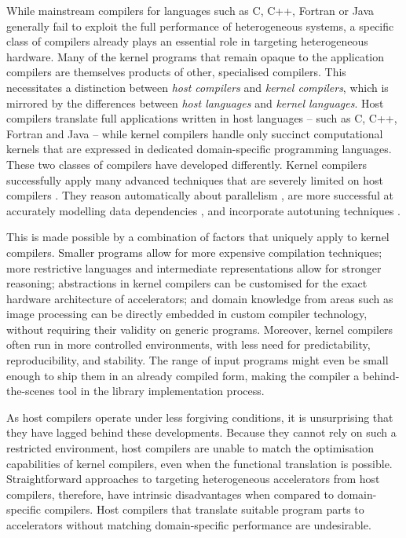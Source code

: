     While mainstream compilers for languages such as C, C++, Fortran or Java
    generally fail to exploit the full performance of heterogeneous systems, a
    specific class of compilers already plays an essential role in
    targeting heterogeneous hardware.
    Many of the kernel programs that remain opaque to the application compilers
    are themselves products of other, specialised compilers.
    This necessitates a distinction between {\em host compilers} and {\em kernel
    compilers}, which is mirrored by the differences between
    {\em host languages} and {\em kernel languages}.
    Host compilers translate full applications written in host languages -- such
    as C, C++, Fortran and Java -- while kernel compilers handle only succinct
    computational kernels that are expressed in dedicated domain-specific
    programming languages.
    These two classes of compilers have developed differently.
    Kernel compilers successfully apply many advanced techniques that are
    severely limited on host compilers
    \citep{Murphy2014LimitsOD,Maleki:2011:EVC:2120965.2121464}.
    They reason automatically about parallelism
    \citep{Steuwer:2017:LFD:3049832.3049841}, are more successful at accurately
    modelling data dependencies \cite{Ragan-Kelley2013Halide}, and incorporate
    autotuning techniques \citep{Ansel:2014:OEF:2628071.2628092}.

    This is made possible by a combination of factors that uniquely apply to
    kernel compilers.
    Smaller programs allow for more expensive compilation techniques;
    more restrictive languages and intermediate representations allow for
    stronger reasoning;
    abstractions in kernel compilers can be customised for the exact hardware
    architecture of accelerators;
    and domain knowledge from areas such as image processing can be directly
    embedded in custom compiler technology, without requiring their validity
    on generic programs.
    Moreover, kernel compilers often run in more controlled environments,
    with less need for predictability, reproducibility, and stability.
    The range of input programs might even be small enough to ship them in an
    already compiled form, making the compiler a behind-the-scenes tool in the
    library implementation process.

    As host compilers operate under less forgiving conditions, it is
    unsurprising that they have lagged behind these developments.
    Because they cannot rely on such a restricted environment, host compilers
    are unable to match the optimisation capabilities of kernel compilers, even
    when the functional translation is possible.
    Straightforward approaches to targeting heterogeneous accelerators from host
    compilers, therefore, have intrinsic disadvantages when compared to
    domain-specific compilers.
    Host compilers that translate suitable program parts to accelerators without
    matching domain-specific performance are undesirable.

